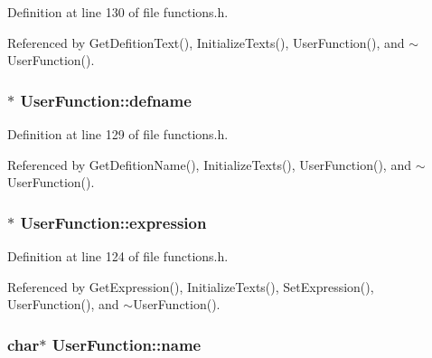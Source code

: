 Definition at line 130 of file functions.\+h.



Referenced by Get\+Defition\+Text(), Initialize\+Texts(), User\+Function(), and $\sim$\+User\+Function().

\subsubsection[{\texorpdfstring{defname}{defname}}]{$\ast$ User\+Function\+::defname\hspace{0.3cm}{\ttfamily [private]}}\hypertarget{classUserFunction_a722d65ef9f73e516689cb474e318b9f7}{}\label{classUserFunction_a722d65ef9f73e516689cb474e318b9f7}


Definition at line 129 of file functions.\+h.



Referenced by Get\+Defition\+Name(), Initialize\+Texts(), User\+Function(), and $\sim$\+User\+Function().

\subsubsection[{\texorpdfstring{expression}{expression}}]{$\ast$ User\+Function\+::expression\hspace{0.3cm}{\ttfamily [private]}}\hypertarget{classUserFunction_ab7a0fb4f1265946883ef4e52dbe032f7}{}\label{classUserFunction_ab7a0fb4f1265946883ef4e52dbe032f7}


Definition at line 124 of file functions.\+h.



Referenced by Get\+Expression(), Initialize\+Texts(), Set\+Expression(), User\+Function(), and $\sim$\+User\+Function().

\subsubsection[{\texorpdfstring{name}{name}}]{\setlength{\rightskip}{0pt plus 5cm}char$\ast$ User\+Function\+::name\hspace{0.3cm}{\ttfamily [private]}}\hypertarget{classUserFunction_a7cb07de0ad054d5001875aa2b3ad639d}{}\label{classUserFunction_a7cb07de0ad054d5001875aa2b3ad639d}


